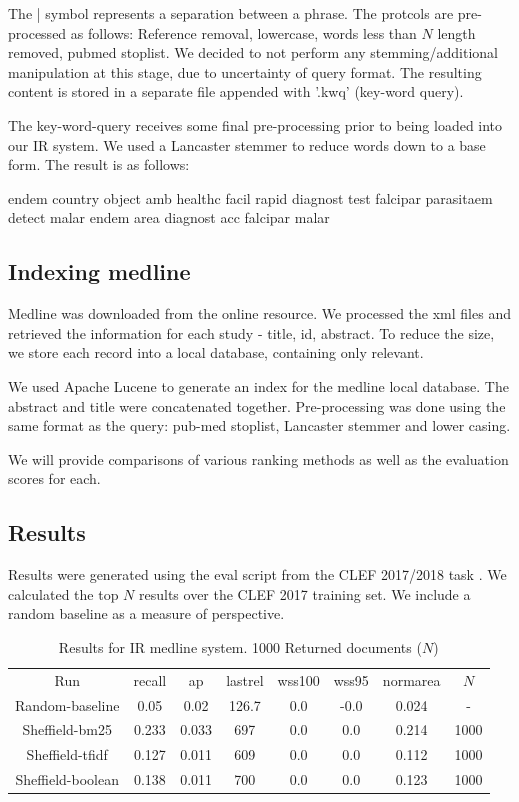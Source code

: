 The | symbol represents a separation between a phrase. The protcols are pre-processed as follows: Reference removal, lowercase, words less than $N$ length removed, pubmed stoplist. We decided to not perform any stemming/additional manipulation at this stage, due to uncertainty of query format. The resulting content is stored in a separate file appended with '.kwq' (key-word query).

The key-word-query receives some final pre-processing prior to being loaded into our IR system. We used a Lancaster stemmer to reduce words down to a base form. The result is as follows:

\begin{tcolorbox}

endem country object amb healthc facil rapid diagnost test falcipar parasitaem detect malar endem area diagnost acc falcipar malar

\end{tcolorbox}

\subsection{Indexing medline}

Medline was downloaded from the online resource. We processed the xml files and retrieved the  information for each study - title, id, abstract. To reduce the size, we store each record into a local database, containing only relevant.

We used Apache Lucene to generate an index for the medline local database. The abstract and title were concatenated together. Pre-processing was done using the same format as the query: pub-med stoplist, Lancaster stemmer and lower casing. 

We will provide comparisons of various ranking methods as well as the evaluation scores for each. 

\subsection{Results}

Results were generated using the eval script from the CLEF 2017/2018 task \cite{Kanoulas12017}. We calculated the top $N$ results over the CLEF 2017 training set. We include a random baseline as a measure of perspective.


\begin{table}[H]
\centering
\begin{tabular}{|c|c|c|c|c|c|c|c|} 
 \hline
 Run & recall &  ap & lastrel & wss100 & wss95 & normarea & $N$ \\ 
 Random-baseline & 0.05 &0.02 & 126.7 &0.0 &-0.0 & 0.024 & - \\
  Sheffield-bm25 & 0.233 &0.033 & 697 &0.0 &0.0 & 0.214 & 1000 \\
  Sheffield-tfidf & 0.127 &0.011 & 609 &0.0 &0.0 & 0.112 & 1000 \\
  Sheffield-boolean & 0.138 &0.011 & 700 &0.0 &0.0 & 0.123 & 1000 \\
 \hline
\end{tabular}
\caption{Results for IR medline system. 1000 Returned documents ($N$)}
\end{table}


